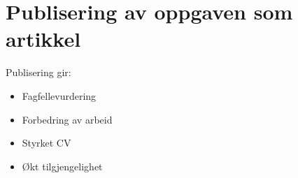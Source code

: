 \chapter{Publisering av oppgaven som artikkel}

Publisering gir:

\begin{itemize}
\item Fagfellevurdering
\item Forbedring av arbeid
\item Styrket CV
\item Økt tilgjengelighet
\end{itemize}
